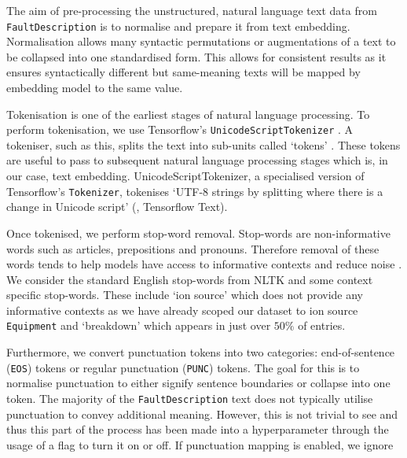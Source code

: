 \documentclass[10pt,oneside]{report}
\begin{document}
The aim of pre-processing the unstructured, natural language text data from \texttt{FaultDescription} is to normalise and prepare it from text embedding. Normalisation allows many syntactic permutations or augmentations of a text to be collapsed into one standardised form. This allows for consistent results as it ensures syntactically different  but same-meaning texts will be mapped by embedding model to the same value. 


Tokenisation is one of the earliest stages of natural language processing. To perform tokenisation, we use Tensorflow's \texttt{UnicodeScriptTokenizer} \cite{tensorflow2015whitepaper}. A tokeniser, such as this, splits the text into sub-units called `tokens' \cite{gefenstette1999tokenization}. These tokens are useful to pass to subsequent natural language processing stages which is, in our case, text embedding. UnicodeScriptTokenizer, a specialised version of Tensorflow's \texttt{Tokenizer}, tokenises `UTF-8 strings by splitting where there is a change in Unicode script' (\cite{tensorflow2015whitepaper}, Tensorflow Text). 

Once tokenised, we perform stop-word removal. Stop-words are non-informative words such as articles, prepositions and pronouns. Therefore removal of these words tends to help models have access to informative contexts and reduce noise \cite{silva2003importance}. We consider the standard English stop-words from NLTK \cite{bird2009natural} and some context specific stop-words. These include `ion source' which does not provide any informative contexts as we have already scoped our dataset to ion source \texttt{Equipment} and `breakdown' which appears in just over $50\%$ of entries. 

Furthermore, we convert punctuation tokens into two categories: end-of-sentence (\texttt{EOS}) tokens or regular punctuation (\texttt{PUNC}) tokens. The goal for this is to normalise punctuation to either signify sentence boundaries or collapse into one token. The majority of the \texttt{FaultDescription} text does not typically utilise punctuation to convey additional meaning. However, this is not trivial to see and thus this part of the process has been made into a hyperparameter through the usage of a flag to turn it on or off. If punctuation mapping is enabled, we ignore  

\end{document}
